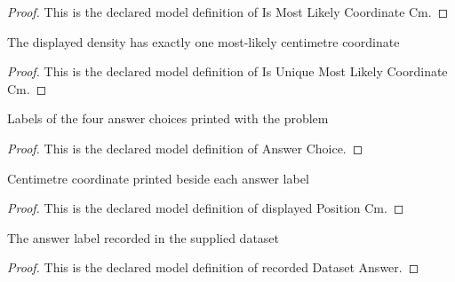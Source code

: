 \begin{proof}
  This is the declared model definition of Is Most Likely Coordinate Cm.
\end{proof}
\begin{definition}
  \label{def:physics:phyx-mini-0653:phyxminiproblems-problemphyxmini0653-isuniquemostlikelycoordinatecm}
  The displayed density has exactly one most-likely centimetre coordinate
\end{definition}
\begin{proof}
  This is the declared model definition of Is Unique Most Likely Coordinate Cm.
\end{proof}
\begin{definition}
  \label{def:physics:phyx-mini-0653:phyxminiproblems-problemphyxmini0653-answerchoice}
  Labels of the four answer choices printed with the problem
\end{definition}
\begin{proof}
  This is the declared model definition of Answer Choice.
\end{proof}
\begin{definition}
  \label{def:physics:phyx-mini-0653:phyxminiproblems-problemphyxmini0653-displayedpositioncm}
  Centimetre coordinate printed beside each answer label
\end{definition}
\begin{proof}
  This is the declared model definition of displayed Position Cm.
\end{proof}
\begin{definition}
  \label{def:physics:phyx-mini-0653:phyxminiproblems-problemphyxmini0653-recordeddatasetanswer}
  The answer label recorded in the supplied dataset
\end{definition}
\begin{proof}
  This is the declared model definition of recorded Dataset Answer.
\end{proof}
